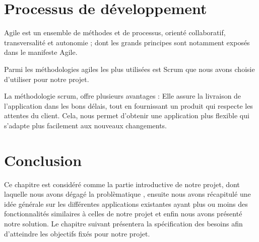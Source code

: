 \section{	Processus de développement}
\hspace{4mm}Agile est un ensemble de méthodes et de processus, orienté collaboratif, transversalité et autonomie ; dont les grands principes sont notamment exposés dans le manifeste Agile.
\par Parmi les méthodologies agiles les plus utilisées est Scrum que nous avons choisie d'utiliser pour notre projet. 
\par La méthodologie scrum, offre plusieurs avantages : Elle assure la livraison de l’application dans les bons délais, tout en fournissant un produit qui respecte les attentes du client. Cela, nous permet d’obtenir une application plus flexible qui s’adapte plus facilement aux nouveaux changements.\newpage



\section*{Conclusion}
\hspace{4mm} Ce chapitre est considéré comme la partie introductive de notre projet, dont laquelle nous avons dégagé la problèmatique , ensuite nous avons récapitulé une idée générale sur les différentes applications existantes ayant plus ou moins des fonctionnalités similaires à celles de notre projet et enfin nous avons présenté notre solution. Le chapitre suivant présentera la spécification des besoins afin d'atteindre les objectifs fixés pour notre projet.

	

